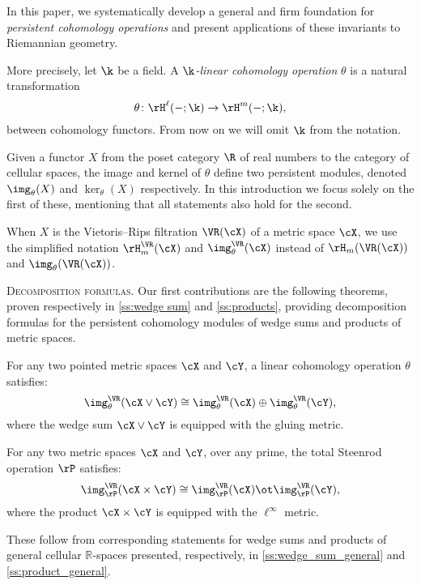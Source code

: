 In this paper, we systematically develop a general and firm foundation for \textit{persistent cohomology operations} and present applications of these invariants to Riemannian geometry.

\medskip More precisely, let \(\k\) be a field.
A \textit{\(\k\)-linear cohomology operation} \(\theta\) is a natural transformation
\[
\theta \colon \rH^\ell(-;\k) \to \rH^m(-;\k),
\]
between cohomology functors.
From now on we will omit \(\k\) from the notation.

Given a functor \(X\) from the poset category $\R$ of real numbers to the category of cellular spaces, the image and kernel of \(\theta\) define two persistent modules, denoted \(\img_\theta(X)\) and \(\ker_\theta(X)\) respectively.
In this introduction we focus solely on the first of these, mentioning that all statements also hold for the second.

When \(X\) is the Vietoris--Rips filtration \(\VR(\cX)\) of a metric space \(\cX\), we use the simplified notation \(\rH_m^\VR(\cX)\) and \(\img_\theta^\VR(\cX)\) instead of \(\rH_m(\VR(\cX))\) and \(\img_\theta(\VR(\cX))\).

\medskip\noindent\textsc{Decomposition formulas.}
Our first contributions are the following theorems, proven respectively in \cref{ss:wedge sum} and \cref{ss:products}, providing decomposition formulas for the persistent cohomology modules of wedge sums and products of metric spaces.

\begin{introtheorem}\label{thm:decomposition1}
	For any two pointed metric spaces $\cX$ and $\cY$, a linear cohomology operation \(\theta\) satisfies:
	\[
	\img_\theta^\VR(\cX \vee \cY) \cong \img_\theta^\VR(\cX) \oplus \img_\theta^\VR(\cY),
	\]
	where the wedge sum \(\cX \vee \cY\) is equipped with the gluing metric.
\end{introtheorem}

\begin{introtheorem}\label{thm:decomposition2}
	For any two metric spaces $\cX$ and $\cY$, over any prime, the total Steenrod operation \(\rP\) satisfies:
	\[
	\img^{\VR}_\rP(\cX \times \cY) \cong \img^{\VR}_\rP(\cX) \ot \img^{\VR}_\rP(\cY),
	\]
	where the product \(\cX \times \cY\) is equipped with the \(\ell^\infty\) metric.
\end{introtheorem}

These follow from corresponding statements for wedge sums and products of general cellular $\mathbb{R}$-spaces presented, respectively, in \cref{ss:wedge_sum_general} and \cref{ss:product_general}.


